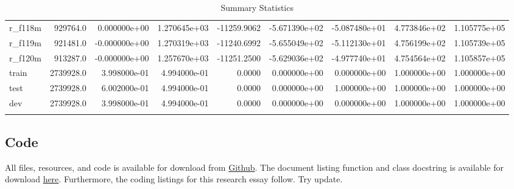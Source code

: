 \documentclass[10pt]{article}
\begin{document}
\begin{landscape}
\begin{longtable}{|l|r|r|r|r|r|r|r|r|}
r\_f118m                 &   929764.0 &  0.000000e+00 &  1.270645e+03 & -11259.9062 & -5.671390e+02 & -5.087480e+01 &  4.773846e+02 &  1.105775e+05 \\
r\_f119m                 &   921481.0 & -0.000000e+00 &  1.270319e+03 & -11240.6992 & -5.655049e+02 & -5.112130e+01 &  4.756199e+02 &  1.105739e+05 \\
r\_f120m                 &   913287.0 & -0.000000e+00 &  1.257670e+03 & -11251.2500 & -5.629036e+02 & -4.977740e+01 &  4.754564e+02 &  1.105857e+05 \\
train                   &  2739928.0 &  3.998000e-01 &  4.994000e-01 &      0.0000 &  0.000000e+00 &  0.000000e+00 &  1.000000e+00 &  1.000000e+00 \\
test                    &  2739928.0 &  6.002000e-01 &  4.994000e-01 &      0.0000 &  0.000000e+00 &  1.000000e+00 &  1.000000e+00 &  1.000000e+00 \\
dev                     &  2739928.0 &  3.998000e-01 &  4.994000e-01 &      0.0000 &  0.000000e+00 &  0.000000e+00 &  1.000000e+00 &  1.000000e+00 \\
\bottomrule
\caption{Summary Statistics}
\label{table:ss}
\end{longtable}
\end{landscape}

\subsection{Code}
All files, resources, and code is available for download from \href{https://github.com/CMCD1996/finance-honours}{Github}.
The document listing function and class docstring is available for download \href{/Users/connor/Google Drive/Documents/Professional/Projects/Portfolio/downloads/wip.pdf}{here}.
Furthermore, the coding listings for this research essay follow. Try update.
% 
\printbibliography
\newpage
\end{document}
